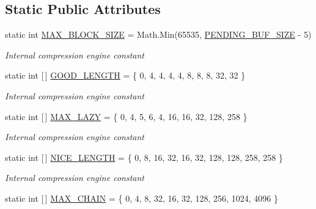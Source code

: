 \subsection*{Static Public Attributes}
\begin{DoxyCompactItemize}
\item 
static int \hyperlink{class_i_c_sharp_code_1_1_sharp_zip_lib_1_1_zip_1_1_compression_1_1_deflater_constants_a24280ae62941189458ada5406677547a}{M\+A\+X\+\_\+\+B\+L\+O\+C\+K\+\_\+\+S\+I\+ZE} = Math.\+Min(65535, \hyperlink{class_i_c_sharp_code_1_1_sharp_zip_lib_1_1_zip_1_1_compression_1_1_deflater_constants_ab3f16a4d73df46efebf60f13b65e431a}{P\+E\+N\+D\+I\+N\+G\+\_\+\+B\+U\+F\+\_\+\+S\+I\+ZE} -\/ 5)
\begin{DoxyCompactList}\small\item\em Internal compression engine constant \end{DoxyCompactList}\item 
static int \mbox{[}$\,$\mbox{]} \hyperlink{class_i_c_sharp_code_1_1_sharp_zip_lib_1_1_zip_1_1_compression_1_1_deflater_constants_a4915b1176720bcd3d5db59e6f96226fc}{G\+O\+O\+D\+\_\+\+L\+E\+N\+G\+TH} = \{ 0, 4, 4, 4, 4, 8, 8, 8, 32, 32 \}
\begin{DoxyCompactList}\small\item\em Internal compression engine constant \end{DoxyCompactList}\item 
static int \mbox{[}$\,$\mbox{]} \hyperlink{class_i_c_sharp_code_1_1_sharp_zip_lib_1_1_zip_1_1_compression_1_1_deflater_constants_adcd07bfe42fb24c860b54658a50d9d85}{M\+A\+X\+\_\+\+L\+A\+ZY} = \{ 0, 4, 5, 6, 4, 16, 16, 32, 128, 258 \}
\begin{DoxyCompactList}\small\item\em Internal compression engine constant \end{DoxyCompactList}\item 
static int \mbox{[}$\,$\mbox{]} \hyperlink{class_i_c_sharp_code_1_1_sharp_zip_lib_1_1_zip_1_1_compression_1_1_deflater_constants_a53da4fbac3701be9243dddc26f30cfdf}{N\+I\+C\+E\+\_\+\+L\+E\+N\+G\+TH} = \{ 0, 8, 16, 32, 16, 32, 128, 128, 258, 258 \}
\begin{DoxyCompactList}\small\item\em Internal compression engine constant \end{DoxyCompactList}\item 
static int \mbox{[}$\,$\mbox{]} \hyperlink{class_i_c_sharp_code_1_1_sharp_zip_lib_1_1_zip_1_1_compression_1_1_deflater_constants_a115f1f3d1e86051ac117ac41e25ea5d8}{M\+A\+X\+\_\+\+C\+H\+A\+IN} = \{ 0, 4, 8, 32, 16, 32, 128, 256, 1024, 4096 \}

\end{DoxyCompactItemize}

